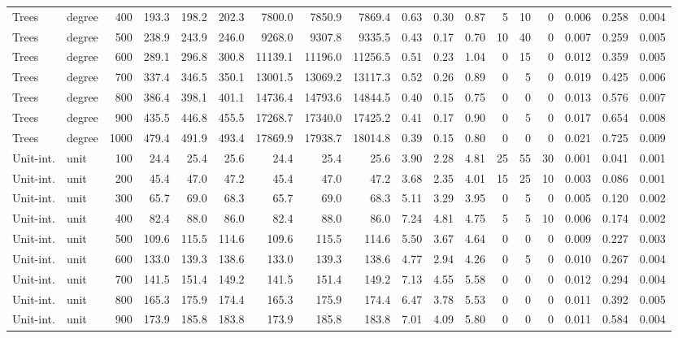 \begin{tabular}{llr rrr rrr rrr rrr rrr}
Trees & degree & 400 & 193.3 & 198.2 & 202.3 & 7800.0 & 7850.9 & 7869.4 & 0.63 & 0.30 & 0.87 & 5 & 10 & 0 & 0.006 & 0.258 & 0.004 \\
Trees & degree & 500 & 238.9 & 243.9 & 246.0 & 9268.0 & 9307.8 & 9335.5 & 0.43 & 0.17 & 0.70 & 10 & 40 & 0 & 0.007 & 0.259 & 0.005 \\
Trees & degree & 600 & 289.1 & 296.8 & 300.8 & 11139.1 & 11196.0 & 11256.5 & 0.51 & 0.23 & 1.04 & 0 & 15 & 0 & 0.012 & 0.359 & 0.005 \\
Trees & degree & 700 & 337.4 & 346.5 & 350.1 & 13001.5 & 13069.2 & 13117.3 & 0.52 & 0.26 & 0.89 & 0 & 5 & 0 & 0.019 & 0.425 & 0.006 \\
Trees & degree & 800 & 386.4 & 398.1 & 401.1 & 14736.4 & 14793.6 & 14844.5 & 0.40 & 0.15 & 0.75 & 0 & 0 & 0 & 0.013 & 0.576 & 0.007 \\
Trees & degree & 900 & 435.5 & 446.8 & 455.5 & 17268.7 & 17340.0 & 17425.2 & 0.41 & 0.17 & 0.90 & 0 & 5 & 0 & 0.017 & 0.654 & 0.008 \\
Trees & degree & 1000 & 479.4 & 491.9 & 493.4 & 17869.9 & 17938.7 & 18014.8 & 0.39 & 0.15 & 0.80 & 0 & 0 & 0 & 0.021 & 0.725 & 0.009 \\
Unit-int. & unit & 100 & 24.4 & 25.4 & 25.6 & 24.4 & 25.4 & 25.6 & 3.90 & 2.28 & 4.81 & 25 & 55 & 30 & 0.001 & 0.041 & 0.001 \\
Unit-int. & unit & 200 & 45.4 & 47.0 & 47.2 & 45.4 & 47.0 & 47.2 & 3.68 & 2.35 & 4.01 & 15 & 25 & 10 & 0.003 & 0.086 & 0.001 \\
Unit-int. & unit & 300 & 65.7 & 69.0 & 68.3 & 65.7 & 69.0 & 68.3 & 5.11 & 3.29 & 3.95 & 0 & 5 & 0 & 0.005 & 0.120 & 0.002 \\
Unit-int. & unit & 400 & 82.4 & 88.0 & 86.0 & 82.4 & 88.0 & 86.0 & 7.24 & 4.81 & 4.75 & 5 & 5 & 10 & 0.006 & 0.174 & 0.002 \\
Unit-int. & unit & 500 & 109.6 & 115.5 & 114.6 & 109.6 & 115.5 & 114.6 & 5.50 & 3.67 & 4.64 & 0 & 0 & 0 & 0.009 & 0.227 & 0.003 \\
Unit-int. & unit & 600 & 133.0 & 139.3 & 138.6 & 133.0 & 139.3 & 138.6 & 4.77 & 2.94 & 4.26 & 0 & 5 & 0 & 0.010 & 0.267 & 0.004 \\
Unit-int. & unit & 700 & 141.5 & 151.4 & 149.2 & 141.5 & 151.4 & 149.2 & 7.13 & 4.55 & 5.58 & 0 & 0 & 0 & 0.012 & 0.294 & 0.004 \\
Unit-int. & unit & 800 & 165.3 & 175.9 & 174.4 & 165.3 & 175.9 & 174.4 & 6.47 & 3.78 & 5.53 & 0 & 0 & 0 & 0.011 & 0.392 & 0.005 \\
Unit-int. & unit & 900 & 173.9 & 185.8 & 183.8 & 173.9 & 185.8 & 183.8 & 7.01 & 4.09 & 5.80 & 0 & 0 & 0 & 0.011 & 0.584 & 0.004 \\

\end{tabular}
